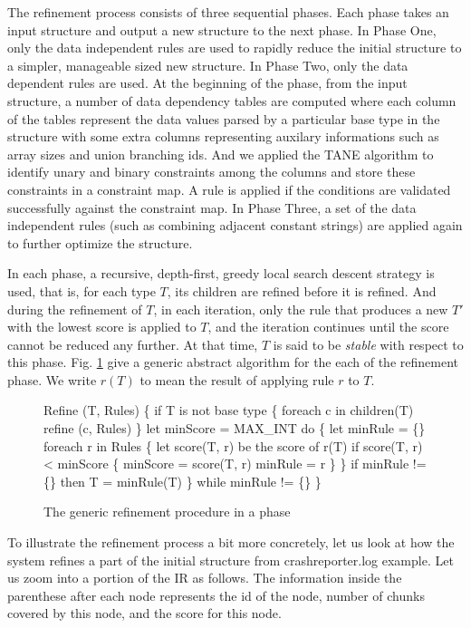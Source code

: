 The refinement process consists of three sequential phases. Each phase takes
an input structure and output a new structure to the next phase. In Phase One, 
only the data independent rules are used to rapidly reduce the initial structure
to a simpler, manageable sized new structure. In Phase Two, 
only the data dependent rules are used. At the beginning of the phase, from the
input structure, a number of data dependency tables are computed where each
column of the tables represent the data values parsed by a particular base type 
in the structure with some extra columns representing auxilary informations such as
array sizes and union branching ids. And we applied the TANE algorithm \cite{TANE-HKPT99}
to identify unary and binary constraints among the columns and store these constraints
in a constraint map. A rule is applied if the conditions are validated successfully
against the constraint map. In Phase Three, a set of the data independent rules
(such as combining adjacent constant strings) are applied again to 
further optimize the structure. 

In each phase, a recursive, depth-first, greedy local search descent strategy is used,
that is, for each type $T$, its children are refined before it is refined. And during
the refinement of $T$, in each iteration, only the rule that produces a new $T'$ with
the lowest score is applied to $T$, and the iteration continues until the
score cannot be reduced any further. At that time, $T$ is said to be {\em stable} with
respect to this phase. Fig. \ref{fig:refinement} give a generic abstract algorithm 
for the each of the refinement phase. We write $r(T)$ to mean the result of applying
rule $r$ to $T$.

\begin{figure}
\begin{code}
Refine (T, Rules)
\{
  if T is not base type 
  \{
    foreach c in children(T)
      refine (c, Rules)
  \}
  let minScore = MAX_INT
  do \{
    let minRule = \{\}
    foreach r in Rules 
    \{
      let score(T, r) be the score of r(T) 
      if score(T, r) < minScore
      \{
        minScore = score(T, r)
        minRule = r
      \}
    \}
    if minRule != \{\} then T = minRule(T)
  \} while minRule != \{\}
\}
\end{code}
\caption{The generic refinement procedure in a phase}
\label{fig:refinement}
\end{figure}

To illustrate the refinement process a bit more concretely, let us look at how
the system refines a part of the initial structure from crashreporter.log example.
Let us zoom into a portion of the IR as follows. The information inside the
parenthese after each node represents the id of the node, number of
chunks covered by this node, and the score for this node.

